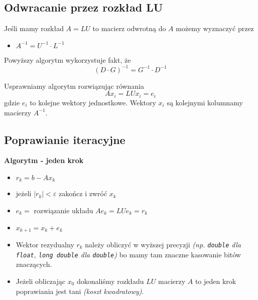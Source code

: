 \documentclass[../mn-notatki.tex]{subfiles}
\begin{document}
\subsection{Odwracanie przez rozkład LU}

\begin{tcolorbox}
Jeśli mamy rozkład $A = LU$ to macierz odwrotną do $A$ możemy wyznaczyć przez
\begin{itemize}
    \item $A^{-1} = U^{-1} \cdot L^{-1}$
\end{itemize}
Powyższy algorytm wykorzystuje fakt, że
\[
(D\cdot G)^{-1} = G^{-1} \cdot D^{-1}
\]
\end{tcolorbox}

Usprawniamy algorytm rozwiązując równania
\[
Ax_i = LUx_i = e_i
\]
gdzie $e_i$ to kolejne wektory jednostkowe. Wektory $x_i$ są kolejnymi
kolumnamy macierzy $A^{-1}$.

\subsection{Poprawianie iteracyjne}

\begin{tcolorbox}
\textbf{Algorytm - jeden krok}
\begin{itemize}
    \item $r_k = b - Ax_k$
    \item jeżeli $|r_k| < \varepsilon$ zakończ i zwróć $x_k$
    \item $e_k = $ rozwiązanie układu $Ae_k = LUe_k = r_k$
    \item $x_{k+1} = x_k + e_k$
\end{itemize}
\end{tcolorbox}

\begin{itemize}
    \item Wektor rezydualny $r_k$ należy obliczyć w wyższej precyzji
    \textit{(np. \texttt{double} dla \texttt{float}, \texttt{long double} dla
    \texttt{double})} bo mamy tam znaczne kasowanie bitów znaczących.
    \item Jeżeli obliczając $x_0$ dokonaliśmy rozkładu $LU$ macierzy $A$ to
    jeden krok poprawiania jest tani \textit{(koszt kwadratowy)}.
\end{itemize}


\pagebreak
\end{document}
